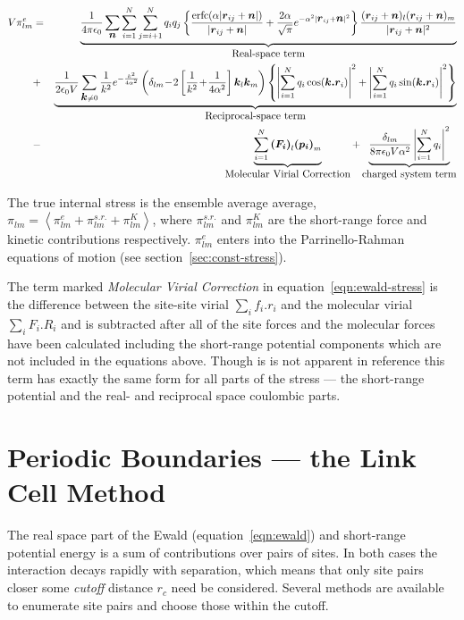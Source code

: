 \begin{eqnarray}
\label{eqn:ewald-stress}
V\pi_{lm}^e & = & \underbrace{\frac{1}{4 \pi \epsilon_0}
\sum_{\bm{n}}\sum_{i=1}^{N} \sum_{j=i+1}^{N} q_iq_j \left \lbrace 
\frac{\erfc( \alpha | \bm{r}_{ij} +  \bm{n} |)}{| \bm{r}_{ij} +\bm{n} | } +
\frac{2 \alpha}{\sqrt{\pi}}e^{- \alpha^2 | \bm{r}_{ij} +  \bm{n} |^2}
\right \rbrace \frac{(\bm{r}_{ij} + \bm{n})_l(\bm{r}_{ij} +
\bm{n})_m}{| \bm{r}_{ij} + \bm{n} |^2}}_{\mbox{Real-space term}} \nonumber \\
 & + & \underbrace{\frac{1}{2 \epsilon_0 V} \sum_{\bm{k} \ne 0} \frac{1}{k^2}
       e^{-\frac{k^2}{4 \alpha^2}}
\left ( \delta_{lm}  \!- \! 2 \left [ \frac{1}{k^2} \! + \! \frac{1}{4 \alpha^2}
\right ] \bm{k}_l\bm{k}_m \right )\left \lbrace 
%
\left | \sum_{i=1}^{N} q_i \cos(\bm{k.r}_i) \right |^2 + 
\left | \sum_{i=1}^{N} q_i \sin(\bm{k.r}_i) \right |^2 
\right \rbrace}_{\mbox{Reciprocal-space term}} \nonumber \\
& - & \underbrace{\sum_{i=1}^{N}  \bm{(F_i)}_l \bm{(p_i)}_m}_{\mbox{Molecular
Virial Correction}} 
+  \underbrace{ \frac{\delta_{lm}}{8 \pi \epsilon_0 V \alpha^2}
                    \left | \sum_{i=1}^N q_i 
                    \right |^2}_{\mbox{charged system term}}
\end{eqnarray}

The true internal stress is the ensemble average average, $\pi_{lm} =
\left < \pi_{lm}^e + \pi_{lm}^{s.r.} + \pi_{lm}^K \right >$, where
$\pi_{lm}^{s.r.}$ and $\pi_{lm}^K$ are the short-range force and
kinetic contributions respectively.  $\pi_{lm}^e$ enters into the
Parrinello-Rahman equations of motion (see
section~\ref{sec:const-stress}).

The term marked {\em Molecular Virial Correction\/} in
equation~\ref{eqn:ewald-stress} is the difference between the
site-site virial $\sum_i f_i.r_i$ and the molecular virial $\sum_i
F_i.R_i$ and is subtracted after all of the site forces and the
molecular forces have been calculated including the short-range
potential components which are not included in the equations above.
Though is is not apparent in reference\cite[Appendix A]{nose:83} this
term has exactly the same form for all parts of the stress --- the
short-range potential and the real- and reciprocal space coulombic
parts.

\section{Periodic Boundaries --- the Link Cell Method}%
\label{sec:link-cell}
The real space part of the Ewald (equation~\ref{eqn:ewald}) and
short-range potential energy is a sum of contributions over pairs of
sites.  In both cases the interaction decays rapidly with separation,
which means that only site pairs closer some {\em cutoff\/} distance
$r_c$ need be considered.  Several methods are available to enumerate
site pairs and choose those within the cutoff.

